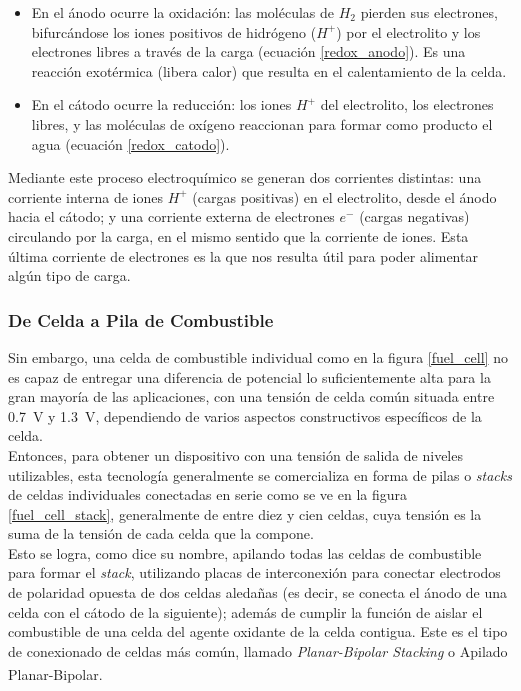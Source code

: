 \begin{itemize}
    \item {\SemiBold En el ánodo ocurre la oxidación:} las moléculas de $H_2$ pierden sus electrones, bifurcándose los iones positivos de hidrógeno ($H^{+}$) por el electrolito y los electrones libres a través de la carga (ecuación \ref{redox_anodo}). Es una reacción exotérmica (libera calor) que resulta en el calentamiento de la celda.
    \item {\SemiBold En el cátodo ocurre la reducción:} los iones $H^{+}$ del electrolito, los electrones libres, y las moléculas de oxígeno reaccionan para formar como producto el agua (ecuación \ref{redox_catodo}).
\end{itemize}

Mediante este proceso electroquímico se generan dos corrientes distintas: una corriente interna de iones $H^{+}$ (cargas positivas) en el electrolito, desde el ánodo hacia el cátodo; y una corriente externa de electrones $e^-$ (cargas negativas) circulando por la carga, en el mismo sentido que la corriente de iones. Esta última corriente de electrones es la que nos resulta útil para poder alimentar algún tipo de carga.\\

\subsubsection{De Celda a Pila de Combustible}

Sin embargo, una celda de combustible individual como en la figura \ref{fuel_cell} no es capaz de entregar una diferencia de potencial lo suficientemente alta para la gran mayoría de las aplicaciones, con una tensión de celda común situada entre \SI{0.7}{\volt} y \SI{1.3}{\volt}, dependiendo de varios aspectos constructivos específicos de la celda.\\

Entonces, para obtener un dispositivo con una tensión de salida de niveles utilizables, esta tecnología generalmente se comercializa en forma de pilas o \textit{stacks} de celdas individuales conectadas en serie como se ve en la figura \ref{fuel_cell_stack}, generalmente de entre diez y cien celdas, cuya tensión es la suma de la tensión de cada celda que la compone.\\

Esto se logra, como dice su nombre, apilando todas las celdas de combustible para formar el \textit{stack}, utilizando placas de interconexión para conectar electrodos de polaridad opuesta de dos celdas aledañas (es decir, se conecta el ánodo de una celda con el cátodo de la siguiente); además de cumplir la función de aislar el combustible de una celda del agente oxidante de la celda contigua. Este es el tipo de conexionado de celdas más común, llamado \textit{Planar-Bipolar Stacking} o Apilado Planar-Bipolar.\textsuperscript{\cite{FCHandbook}}


